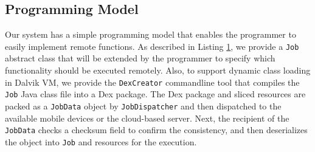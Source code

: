 \documentclass{sig-alternate}[10pt]
\begin{document}
\begin{CCSXML}
\subsection{Programming Model} \label{prog_model}
Our system has a simple programming model that enables the programmer to easily implement remote functions. As described in Listing \ref{code:job_def}, we provide a \texttt{Job} abstract class that will be extended by the programmer to specify which functionality should be executed remotely. Also, to support dynamic class loading in Dalvik VM, we provide the \texttt{DexCreator} commandline tool that compiles the \texttt{Job} Java class file into a Dex package. The Dex package and sliced resources are packed as a \texttt{JobData} object by \texttt{JobDispatcher} and then dispatched to the available mobile devices or the cloud-based server. Next, the recipient of the \texttt{JobData} checks a checksum field to confirm the consistency, and then deserializes the object into \texttt{Job} and resources for the execution.

\begin{figure}
\noindent {}	
\noindent {}	
\label{code:job_def}
\end{figure}



\end{CCSXML}
\end{document}
